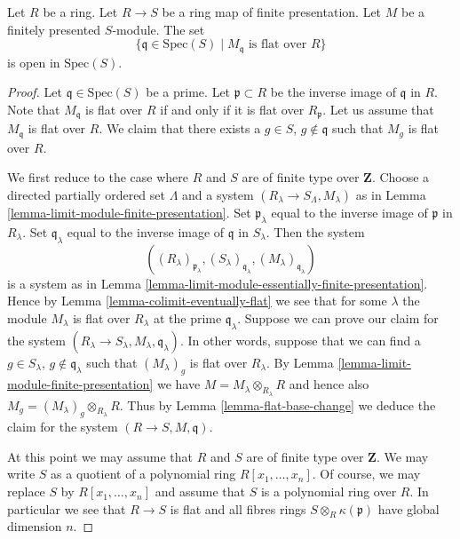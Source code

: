 \begin{theorem}
\label{theorem-openess-flatness}
Let $R$ be a ring. Let $R \to S$ be a ring map of finite
presentation. Let $M$ be a finitely presented $S$-module.
The set
$$
\{ \mathfrak q \in \text{Spec}(S) \mid
M_{\mathfrak q}\text{ is flat over }R\}
$$
is open in $\text{Spec}(S)$.
\end{theorem}

\begin{proof}
Let $\mathfrak q \in \text{Spec}(S)$ be a prime.
Let $\mathfrak p \subset R$ be the inverse image of $\mathfrak q$ in $R$.
Note that $M_{\mathfrak q}$ is flat over $R$ if and only if
it is flat over $R_{\mathfrak p}$.
Let us assume that $M_{\mathfrak q}$ is flat over $R$.
We claim that there exists a $g \in S$, $g \not \in \mathfrak q$
such that $M_g$ is flat over $R$.

\medskip\noindent
We first reduce to the case where $R$ and $S$ are
of finite type over $\mathbf{Z}$.
Choose a directed partially ordered set $\Lambda$ and
a system $(R_\lambda \to S_\Lambda, M_\lambda)$
as in Lemma \ref{lemma-limit-module-finite-presentation}.
Set $\mathfrak p_\lambda$ equal to the inverse image of
$\mathfrak p$ in $R_\lambda$.
Set $\mathfrak q_\lambda$ equal to the inverse image of
$\mathfrak q$ in $S_\lambda$.
Then the system
$$
((R_\lambda)_{\mathfrak p_\lambda},
(S_\lambda)_{\mathfrak q_\lambda},
(M_\lambda)_{\mathfrak q_{\lambda}})
$$
is a system as in
Lemma \ref{lemma-limit-module-essentially-finite-presentation}.
Hence by Lemma \ref{lemma-colimit-eventually-flat}
we see that for some $\lambda$ the module
$M_\lambda$ is flat over $R_\lambda$ at the prime
$\mathfrak q_{\lambda}$. Suppose we
can prove our claim for the system
$(R_\lambda \to S_\lambda, M_\lambda, \mathfrak q_{\lambda})$.
In other words, suppose that we can find a $g \in S_\lambda$,
$g \not\in \mathfrak q_\lambda$ such that $(M_\lambda)_g$
is flat over $R_\lambda$. By Lemma \ref{lemma-limit-module-finite-presentation}
we have $M = M_\lambda \otimes_{R_\lambda} R$ and hence
also $M_g = (M_\lambda)_g \otimes_{R_\lambda} R$. Thus by
Lemma \ref{lemma-flat-base-change} we deduce the claim
for the system $(R \to S, M, \mathfrak q)$.

\medskip\noindent
At this point we may assume that $R$ and $S$ are of finite type
over $\mathbf{Z}$. We may write $S$ as a quotient of a
polynomial ring $R[x_1, \ldots, x_n]$. Of course, we may replace
$S$ by $R[x_1, \ldots, x_n]$ and assume that $S$ is a polynomial
ring over $R$. In particular we see that $R \to S$ is flat
and all fibres rings $S \otimes_R \kappa(\mathfrak p)$
have global dimension $n$.


\end{proof}
